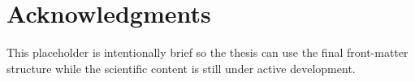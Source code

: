 \begingroup
\let\clearpage\relax
\let\cleardoublepage\relax
\chapter*{Acknowledgments}


This placeholder is intentionally brief so the thesis can use the final front-matter structure while the scientific content is still under active development.

\endgroup

